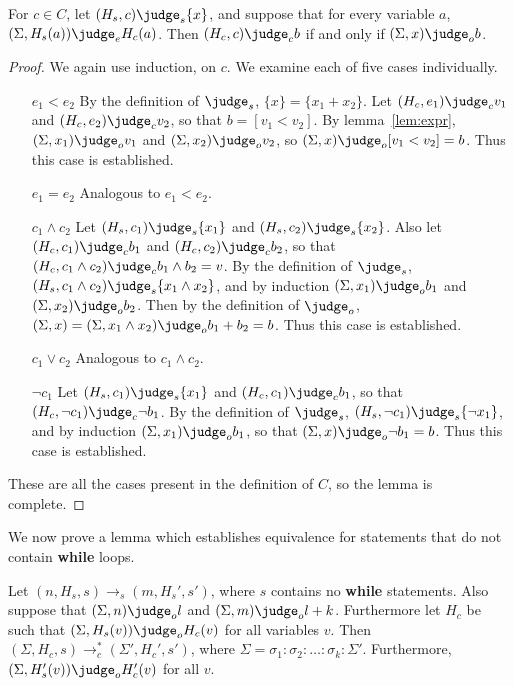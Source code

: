 \begin{lemma} \label{lem:cond}
  For $c \in C$, let $(H_s, c) \judge_s \{ x \}$, and suppose that for
  every variable $a$, $(\Sigma, H_s(a)) \judge_e H_c(a)$.  Then $(H_c,
  c) \judge_c b$ if and only if $(\Sigma, x) \judge_o b$.
\end{lemma}

\begin{proof}
We again use induction, on $c$.  We examine each of five cases
individually.

\begin{itemize}
\item[$e_1 < e_2$] By the definition of $\judge_s$, $\{ x \} = \{ x_1
  + x_2 \}$.  Let $(H_c, e_1) \judge_c v_1$ and $(H_c, e_2) \judge_c
  v_2$, so that $b = [v_1 < v_2]$.  By lemma~\ref{lem:expr}, $(\Sigma,
  x_1) \judge_o v_1$ and $(\Sigma, x_2) \judge_o v_2$, so $(\Sigma, x)
  \judge_o [v_1 < v_2] = b$.  Thus this case is established.
\item[$e_1 = e_2$] Analogous to $e_1 < e_2$.
\item[$c_1 \wedge c_2$] Let $(H_s, c_1) \judge_s \{ x_1 \}$ and $(H_s,
  c_2) \judge_s \{ x_2 \}$. Also let $(H_c, c_1) \judge_c b_1$ and
  $(H_c, c_2) \judge_c b_2$, so that $(H_c, c_1 \wedge c_2) \judge_c
  b_1 \wedge b_2 = v$.  By the definition of $\judge_s$, $(H_s, c_1
  \wedge c_2) \judge_s \{ x_1 \wedge x_2 \}$, and by induction
  $(\Sigma, x_1) \judge_o b_1$ and $(\Sigma, x_2) \judge_o b_2$.  Then
  by the definition of $\judge_o$, $(\Sigma, x) = (\Sigma, x_1 \wedge
  x_2) \judge_o b_1 + b_2 = b$.  Thus this case is established.
\item[$c_1 \vee c_2$] Analogous to $c_1 \wedge c_2$.
\item[$\neg c_1$] Let $(H_s, c_1) \judge_s \{ x_1 \}$ and $(H_c, c_1)
  \judge_c b_1$, so that $(H_c, \neg c_1) \judge_c \neg b_1$.  By the
  definition of $\judge_s$, $(H_s, \neg c_1) \judge_s \{ \neg x_1 \}$,
  and by induction $(\Sigma, x_1) \judge_o b_1$, so that $(\Sigma, x)
  \judge_o \neg b_1 = b$.  Thus this case is established.
\end{itemize}

These are all the cases present in the definition of $C$, so the lemma
is complete.

\end{proof}

We now prove a lemma which establishes equivalence for statements that
do not contain \textbf{while} loops.

\begin{lemma}
  \label{lem:stmt}
  Let
  $(n, H_s, s) \to_s (m, H_s', s')$,
  where $s$ contains no \textbf{while} statements.
  Also suppose that $(\Sigma, n) \judge_o l$
  and $(\Sigma, m) \judge_o l + k$.
  Furthermore let $H_c$ be such that
  $(\Sigma, H_s(v)) \judge_o H_c(v)$
  for all variables $v$. Then
  $(\Sigma, H_c, s) \to_c^{*} (\Sigma', H_c', s')$,
  where
  $\Sigma = \sigma_1:\sigma_2:\dots:\sigma_k:\Sigma'$.
  Furthermore,
  $(\Sigma, H_s'(v)) \judge_o H_c'(v)$
  for all $v$.
\end{lemma}


